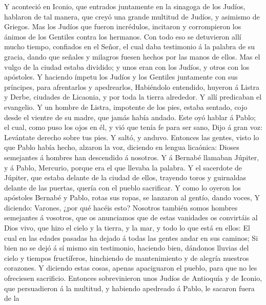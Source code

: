  Y aconteció en Iconio, que entrados juntamente en la
sinagoga de los Judíos, hablaron de tal manera, que creyó una grande
multitud de Judíos, y asimismo de Griegos.  Mas los Judíos
que fueron incrédulos, incitaron y corrompieron los ánimos de los
Gentiles contra los hermanos.  Con todo eso se detuvieron
allí mucho tiempo, confiados en el Señor, el cual daba testimonio á la
palabra de su gracia, dando que señales y milagros fuesen hechos por las
manos de ellos.  Mas el vulgo de la ciudad estaba
dividido; y unos eran con los Judíos, y otros con los apóstoles.
 Y haciendo ímpetu los Judíos y los Gentiles juntamente
con sus príncipes, para afrentarlos y apedrearlos, 
Habiéndolo entendido, huyeron á Listra y Derbe, ciudades de Licaonia, y
por toda la tierra alrededor.  Y allí predicaban el
evangelio.  Y un hombre de Listra, impotente de los pies,
estaba sentado, cojo desde el vientre de su madre, que jamás había
andado.  Este oyó hablar á Pablo; el cual, como puso los
ojos en él, y vió que tenía fe para ser sano,  Dijo á
gran voz: Levántate derecho sobre tus pies. Y saltó, y anduvo.
 Entonces las gentes, visto lo que Pablo había hecho,
alzaron la voz, diciendo en lengua licaónica: Dioses semejantes á
hombres han descendido á nosotros.  Y á Bernabé llamaban
Júpiter, y á Pablo, Mercurio, porque era el que llevaba la palabra.
 Y el sacerdote de Júpiter, que estaba delante de la
ciudad de ellos, trayendo toros y guirnaldas delante de las puertas,
quería con el pueblo sacrificar.  Y como lo oyeron los
apóstoles Bernabé y Pablo, rotas sus ropas, se lanzaron al gentío, dando
voces,  Y diciendo: Varones, ¿por qué hacéis esto?
Nosotros también somos hombres semejantes á vosotros, que os anunciamos
que de estas vanidades os convirtáis al Dios vivo, que hizo el cielo y
la tierra, y la mar, y todo lo que está en ellos:  El
cual en las edades pasadas ha dejado á todas las gentes andar en sus
caminos;  Si bien no se dejó á sí mismo sin testimonio,
haciendo bien, dándonos lluvias del cielo y tiempos fructíferos,
hinchiendo de mantenimiento y de alegría nuestros corazones.
 Y diciendo estas cosas, apenas apaciguaron el pueblo,
para que no les ofreciesen sacrificio.  Entonces
sobrevinieron unos Judíos de Antioquía y de Iconio, que persuadieron á
la multitud, y habiendo apedreado á Pablo, le sacaron fuera de la
